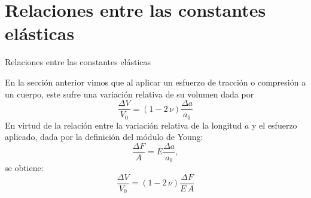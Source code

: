 \documentclass[11pt,handout,aspectratio=1610]{beamer}
\begin{document}
\section{Relaciones entre las constantes elásticas}

\begin{frame}{Relaciones entre las constantes elásticas}

    En la sección anterior vimos que al aplicar un esfuerzo de tracción o compresión a un cuerpo, este sufre una variación relativa de su volumen dada por $$ \frac{\Delta V}{V_0} = \left(1 - 2 \, \nu\right) \frac{\Delta a}{a_0} $$ En virtud de la relación entre la variación relativa de la longitud $a$ y el esfuerzo aplicado, dada por la definición del módulo de Young: $$ \frac{\Delta F}{A} = E \frac{\Delta a}{a_0},$$ se obtiene: $$ \frac{\Delta V}{V_0} = \left(1 - 2 \, \nu\right) \frac{\Delta F}{E \, A} $$

\end{frame}
\end{document}
